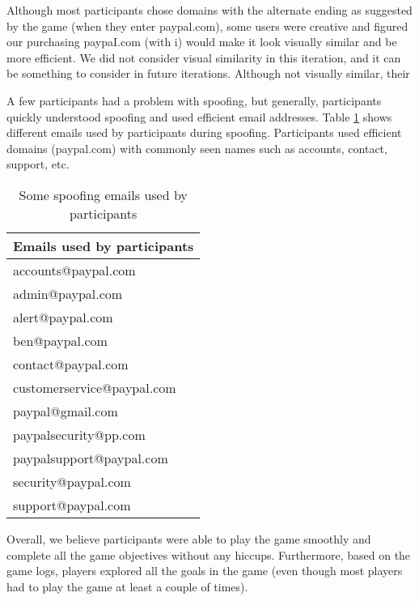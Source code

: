 Although most participants chose domains with the alternate ending as suggested by the game (when they enter paypal.com), some users were creative and figured our purchasing paypaI.com (with i) would make it look visually similar and be more efficient. We did not consider visual similarity in this iteration, and it can be something to consider in future iterations. Although not visually similar, their

A few participants had a problem with spoofing, but generally, participants quickly understood spoofing and used efficient email addresses. Table \ref{tab:spoofing_emails} shows different emails used by participants during spoofing. Participants used efficient domains (paypal.com) with commonly seen names such as accounts, contact, support, etc.

\begin{table}
    \centering
    \begin{tabular}{l}
        \hline
        \textbf{Emails used by participants} \\
        \hline
        accounts@paypal.com                  \\
        admin@paypal.com                     \\
        alert@paypal.com                     \\
        ben@paypal.com                       \\
        contact@paypal.com                   \\
        customerservice@paypal.com           \\
        paypal@gmail.com                     \\
        paypalsecurity@pp.com                \\
        paypalsupport@paypal.com             \\
        security@paypal.com                  \\
        support@paypal.com                   \\
        \hline
    \end{tabular}
    \caption{Some spoofing emails used by participants}
    \label{tab:spoofing_emails}
\end{table}

Overall, we believe participants were able to play the game smoothly and complete all the game objectives without any hiccups. Furthermore, based on the game logs, players explored all the goals in the game (even though most players had to play the game at least a couple of times).

